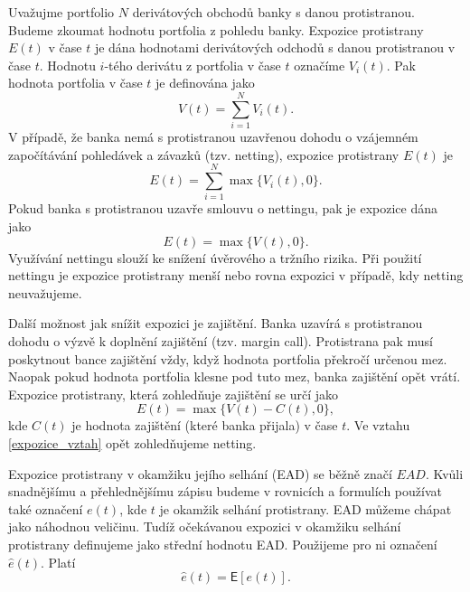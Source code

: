 \documentclass[a4paper,12pt]{report}
\theoremstyle{definition} \newtheorem{definice}[veta]{Definice}
\theoremstyle{remark}
\begin{document}
Uvažujme portfolio $N$ derivátových obchodů banky s danou protistranou.
Budeme zkoumat hodnotu portfolia z pohledu banky.
Expozice protistrany $E(t)$ v čase $t$ je dána hodnotami derivátových odchodů s danou protistranou v čase $t$.
Hodnotu $i$-tého derivátu z portfolia v čase $t$  označíme $V_i(t)$.
Pak hodnota portfolia v čase $t$ je definována jako
\begin{equation}
V(t)=\sum_{i=1}^N V_i(t).
\end{equation}
V případě, že banka nemá s protistranou uzavřenou dohodu o vzájemném započítávání pohledávek a závazků (tzv. netting), expozice protistrany $E(t)$ je 
\begin{equation}\label{exp_vztah}
E(t)=\sum_{i=1}^N\max\{V_i(t),0\}.
\end{equation}
Pokud banka s protistranou uzavře smlouvu o nettingu, pak je expozice dána jako
\begin{equation}\label{exp_vztah_net}
E(t)=\max\{V(t),0\}.
\end{equation}
Využívání nettingu slouží ke snížení úvěrového a tržního rizika. 
Při použití nettingu je expozice protistrany menší nebo rovna expozici v případě, kdy netting neuvažujeme. 

Další možnost jak snížit expozici je zajištění.
Banka uzavírá s protistranou dohodu o výzvě k doplnění zajištění (tzv. margin call).
Protistrana pak musí poskytnout bance zajištění vždy, když hodnota portfolia překročí určenou mez.
Naopak pokud hodnota portfolia klesne pod tuto mez, banka zajištění opět vrátí.
Expozice protistrany, která zohledňuje zajištění se určí jako
\begin{equation}\label{expozice_vztah}
E(t)=\max\{V(t)-C(t),0\},
\end{equation}
kde $C(t)$ je hodnota zajištění (které banka přijala) v čase $t$.  
Ve vztahu \eqref{expozice_vztah} opět zohledňujeme netting.

Expozice protistrany v okamžiku jejího selhání (EAD) se běžně značí $EAD$.
Kvůli snadnějšímu a přehlednějšímu zápisu budeme v rovnicích a formulích používat také označení $e(t)$, kde $t$ je okamžik selhání protistrany.
EAD můžeme chápat jako náhodnou veličinu.
Tudíž očekávanou expozici v okamžiku selhání protistrany definujeme jako střední hodnotu EAD. Použijeme pro ni označení $\hat{e}(t)$.
Platí
\begin{equation}
\hat{e}(t)=\mathsf{E}[e(t)].
\end{equation}
\end{document}
